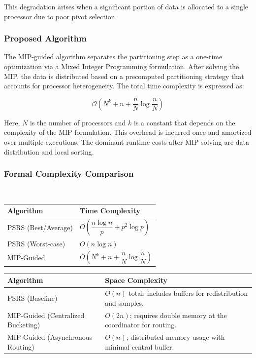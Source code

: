 \documentclass[]{interact}
\theoremstyle{plain}
\theoremstyle{definition}
\theoremstyle{remark}
\begin{document}
This degradation arises when a significant portion of data is allocated to a single processor due to poor pivot selection.

\subsubsection{Proposed Algorithm}

The MIP-guided algorithm separates the partitioning step as a one-time optimization via a Mixed Integer Programming formulation. After solving the MIP, the data is distributed based on a precomputed partitioning strategy that accounts for processor heterogeneity. The total time complexity is expressed as:

\begin{equation}
    \mathcal{O}\left(N^k + n + \frac{n}{N} \log \frac{n}{N}\right)
\end{equation}

Here, $N$ is the number of processors and $k$ is a constant that depends on the complexity of the MIP formulation. This overhead is incurred once and amortized over multiple executions. The dominant runtime costs after MIP solving are data distribution and local sorting.



\subsubsection{Formal Complexity Comparison}

\begin{table}[H]\
\centering
\begin{tabular}{|p{6.6cm}|p{6.6cm}|}
\hline
\textbf{Algorithm} & \textbf{Time Complexity} \\
\hline
PSRS (Best/Average) & $O\left(\dfrac{n \log n}{p} + p^2 \log p\right)$ \\
\hline
PSRS (Worst-case) & $O(n \log n)$ \\
\hline
MIP-Guided & $O\left(N^k + n + \dfrac{n}{N} \log \dfrac{n}{N}\right)$ \\
\hline
\end{tabular}
\end{table}


\begin{table}[H]
\centering
\begin{tabular}{|p{6.6cm}|p{6.6cm}|}
\hline
\textbf{Algorithm} & \textbf{Space Complexity} \\
\hline
PSRS (Baseline) & $O(n)$ total; includes buffers for redistribution and samples. \\
\hline
MIP-Guided (Centralized Bucketing) & $O(2n)$; requires double memory at the coordinator for routing. \\
\hline
MIP-Guided (Asynchronous Routing) & $O(n)$; distributed memory usage with minimal central buffer. \\
\hline
\end{tabular}
\end{table}
\end{document}
